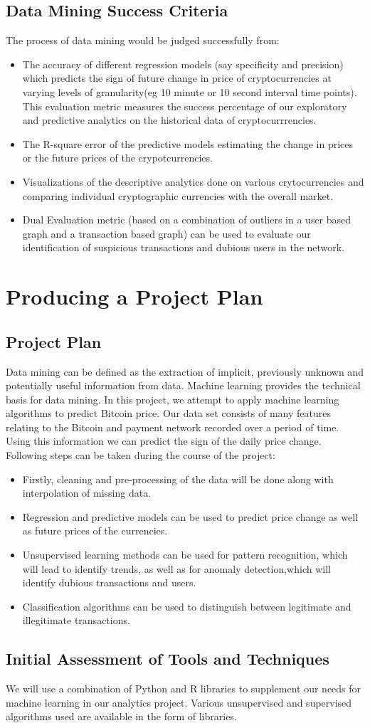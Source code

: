 \documentclass{article}
\begin{document}
\subsection{Data Mining Success Criteria}
The process of data mining would be judged successfully from:
\begin{itemize}
    \item The accuracy of different regression models (say specificity and precision) which predicts the sign of future change in price of cryptocurrencies at varying levels of granularity(eg 10 minute or 10 second interval time points). This evaluation metric measures the success percentage of our exploratory and predictive analytics on the historical data of cryptocurrrencies.
    \item The R-square error of the predictive models estimating the change in prices or the future prices of the crypotcurrencies.
    \item Visualizations of the descriptive analytics done on various crytocurrencies and comparing individual cryptographic currencies with the overall market.
    \item Dual Evaluation metric (based on a combination of outliers in a user based graph and a transaction based graph) can be used to evaluate our identification of suspicious transactions and dubious users in the network.
\end{itemize}

\section{Producing a Project Plan}
\subsection{Project Plan}
Data mining can be defined as the extraction of implicit, previously unknown and potentially useful information from data. Machine learning provides the technical basis for data mining. In this project, we attempt to apply machine learning algorithms to predict Bitcoin price. Our data set consists of many features relating to the Bitcoin and payment network recorded over a period of time. Using this information we can predict the sign of the daily price change. Following steps can be taken during the course of the project:
\begin{itemize}
    \item Firstly, cleaning and pre-processing of the data will be done along with interpolation of missing data.
    \item Regression and predictive models can be used to predict price change as well as future prices of the currencies.
    \item Unsupervised learning methods can be used for pattern recognition, which will lead to identify trends, as well as for anomaly detection,which will identify dubious transactions and users.
    \item Classification algorithms can be used to distinguish between legitimate and illegitimate transactions.
\end{itemize}

\subsection{Initial Assessment of Tools and Techniques}
We will use a combination of Python and R libraries to supplement our needs for machine learning in our analytics project. Various unsupervised and supervised algorithms used are available in the form of libraries. 
\end{document}
